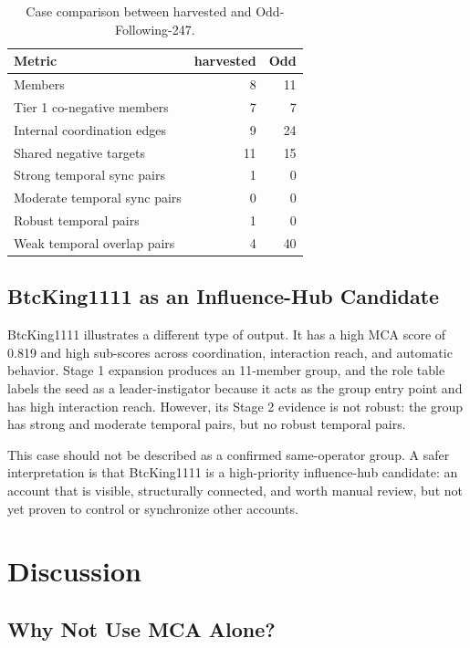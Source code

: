 \documentclass[conference]{IEEEtran}
\begin{document}
\begin{table}[htbp]
\centering
\caption{Case comparison between harvested and Odd-Following-247.}
\label{tab:casecompare}
\scriptsize
\begin{tabular}{p{}rr}
\toprule
Metric & harvested & Odd \\
\midrule
Members & 8 & 11 \\
Tier 1 co-negative members & 7 & 7 \\
Internal coordination edges & 9 & 24 \\
Shared negative targets & 11 & 15 \\
Strong temporal sync pairs & 1 & 0 \\
Moderate temporal sync pairs & 0 & 0 \\
Robust temporal pairs & 1 & 0 \\
Weak temporal overlap pairs & 4 & 40 \\
\bottomrule
\end{tabular}
\end{table}

\subsection{BtcKing1111 as an Influence-Hub Candidate}

BtcKing1111 illustrates a different type of output. It has a high MCA score
of 0.819 and high sub-scores across coordination, interaction reach, and
automatic behavior. Stage 1 expansion produces an 11-member group, and the
role table labels the seed as a leader-instigator because it acts as the group
entry point and has high interaction reach. However, its Stage 2 evidence is
not robust: the group has strong and moderate temporal pairs, but no robust
temporal pairs.

This case should not be described as a confirmed same-operator group. A safer
interpretation is that BtcKing1111 is a high-priority influence-hub candidate:
an account that is visible, structurally connected, and worth manual review,
but not yet proven to control or synchronize other accounts.

\section{Discussion}

\subsection{Why Not Use MCA Alone?}
\end{document}
